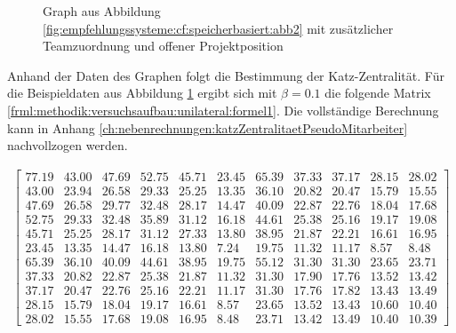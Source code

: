 \begin{figure}[h]
	
	\caption{Graph aus Abbildung \ref{fig:empfehlungssysteme:cf:speicherbasiert:abb2} mit zusätzlicher Teamzuordnung und offener Projektposition}
	\label{fig:methodik:versuchsaufbau:unilateral:abb1}
\end{figure}

Anhand der Daten des Graphen folgt die Bestimmung der Katz-Zentralität. Für die Beispieldaten aus Abbildung \ref{fig:methodik:versuchsaufbau:unilateral:abb1} ergibt sich mit $\beta = 0.1$ die folgende Matrix \ref{frml:methodik:versuchsaufbau:unilateral:formel1}. Die vollständige Berechnung kann in Anhang \ref{ch:nebenrechnungen:katzZentralitaetPseudoMitarbeiter} nachvollzogen werden.

\begin{gather}
	\begin{bmatrix}
		77.19 & 43.00 & 47.69 & 52.75 & 45.71 & 23.45 & 65.39 & 37.33 & 37.17 & 28.15 & 28.02\\
		43.00 & 23.94 & 26.58 & 29.33 & 25.25 & 13.35 & 36.10 & 20.82 & 20.47 & 15.79 & 15.55\\
		47.69 & 26.58 & 29.77 & 32.48 & 28.17 & 14.47 & 40.09 & 22.87 & 22.76 & 18.04 & 17.68\\
		52.75 & 29.33 & 32.48 & 35.89 & 31.12 & 16.18 & 44.61 & 25.38 & 25.16 & 19.17 & 19.08\\
		45.71 & 25.25 & 28.17 & 31.12 & 27.33 & 13.80 & 38.95 & 21.87 & 22.21 & 16.61 & 16.95\\
		23.45 & 13.35 & 14.47 & 16.18 & 13.80 & 7.24 & 19.75 & 11.32 & 11.17 & 8.57 & 8.48\\
		65.39 & 36.10 & 40.09 & 44.61 & 38.95 & 19.75 & 55.12 & 31.30 & 31.30 & 23.65 & 23.71\\
		37.33 & 20.82 & 22.87 & 25.38 & 21.87 & 11.32 & 31.30 & 17.90 & 17.76 & 13.52 & 13.42\\
		37.17 & 20.47 & 22.76 & 25.16 & 22.21 & 11.17 & 31.30 & 17.76 & 17.82 & 13.43 & 13.49\\
		28.15 & 15.79 & 18.04 & 19.17 & 16.61 & 8.57 & 23.65 & 13.52 & 13.43 & 10.60 & 10.40\\
		28.02 & 15.55 & 17.68 & 19.08 & 16.95 & 8.48 & 23.71 & 13.42 & 13.49 & 10.40 & 10.39
	\end{bmatrix}
	\label{frml:methodik:versuchsaufbau:unilateral:formel1}
\end{gather}

